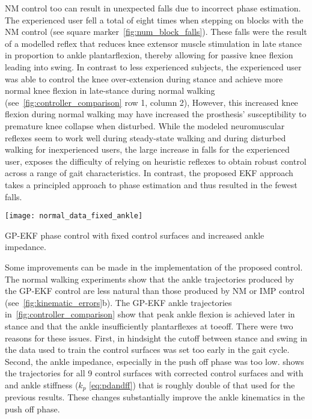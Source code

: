 NM control too can result in unexpected falls due to incorrect phase estimation.
The experienced user fell a total of eight times when stepping on blocks with
the NM control (see square marker~\cref{fig:num_block_falls}). These falls were
the result of a modelled reflex that reduces knee extensor muscle stimulation in
late stance in proportion to ankle plantarflexion, thereby allowing for passive
knee flexion leading into swing. In contrast to less experienced subjects, the
experienced user was able to control the knee over-extension during stance and
achieve more normal knee flexion in late-stance during normal walking
(see~\cref{fig:controller_comparison} row 1, column 2), However, this increased
knee flexion during normal walking may have increased the prosthesis'
susceptibility to premature knee collapse when disturbed. While the modeled
neuromuscular reflexes seem to work well during steady-state walking and during
disturbed walking for inexperienced users, the large increase in falls for the
experienced user, exposes the difficulty of relying on heuristic reflexes to
obtain robust control across a range of gait characteristics. In contrast, the
proposed EKF approach takes a principled approach to phase estimation and thus
resulted in the fewest falls.

\begin{marginfigure}
    \centering
    \texttt{[image: normal\_data\_fixed\_ankle]}
    \caption{GP-EKF phase control with fixed control surfaces and
    increased ankle impedance.}\label{fig:gp_ekf_fixed}
\end{marginfigure}
Some improvements can be made in the implementation of the proposed control.
The normal walking experiments show that the ankle trajectories produced by the
GP-EKF control are less natural than those produced by NM or IMP control
(see~\cref{fig:kinematic_errors}b). The GP-EKF ankle trajectories
in~\cref{fig:controller_comparison} show that peak ankle flexion is achieved
later in stance and that the ankle insufficiently plantarflexes at toeoff.
There were two reasons for these issues. First, in hindsight the cutoff between
stance and swing in the data used to train the control surfaces was set too
early in the gait cycle. Second, the ankle impedance, especially in the push off
phase was too low.  shows the trajectories for all 9
control surfaces with corrected control surfaces and with and ankle stiffness
($k_p$ \cref{eq:pdandff}) that is roughly double of that used for the previous
results. These changes substantially improve the ankle kinematics in the push
off phase.

